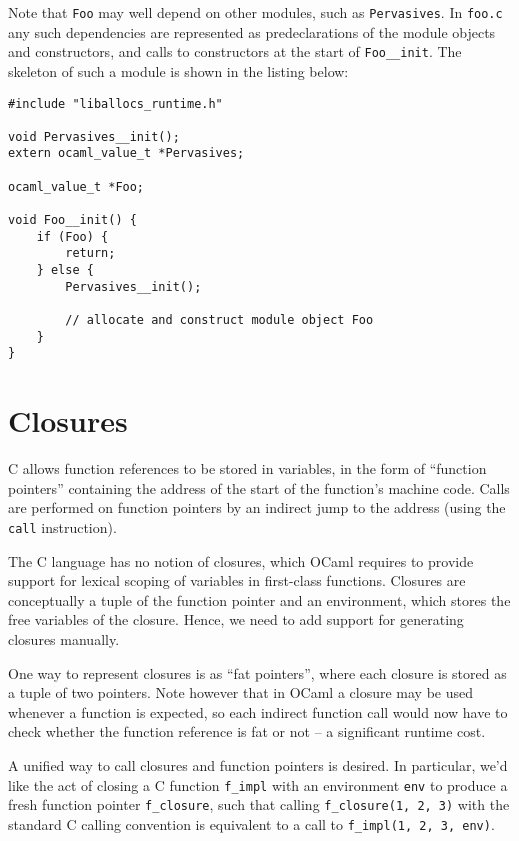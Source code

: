 \documentclass[12pt,a4paper,twoside,openright]{report}
\begin{document}
Note that \lstinline!Foo! may well depend on other modules, such as \lstinline!Pervasives!. In \lstinline!foo.c! any such dependencies are represented as predeclarations of the module objects and constructors, and calls to constructors at the start of \lstinline!Foo__init!. The skeleton of such a module is shown in the listing below:

\begin{lstlisting}
#include "liballocs_runtime.h"

void Pervasives__init();
extern ocaml_value_t *Pervasives;

ocaml_value_t *Foo;

void Foo__init() {
    if (Foo) {
        return;
    } else {
        Pervasives__init();

        // allocate and construct module object Foo
    }
}
\end{lstlisting}

\section{Closures}

C allows function references to be stored in variables, in the form of
``function pointers'' containing the address of the start of the function's
machine code. Calls are performed on function pointers by an indirect jump to
the address (using the \lstinline!call! instruction).

The C language has no notion of closures, which OCaml requires to provide
support for lexical scoping of variables in first-class functions. Closures are
conceptually a tuple of the function pointer and an environment, which stores
the free variables of the closure. Hence, we need to add support for generating
closures manually.

One way to represent closures is as ``fat pointers'', where each closure is
stored as a tuple of two pointers. Note however that in OCaml a closure may be
used whenever a function is expected, so each indirect function call would now
have to check whether the function reference is fat or not -- a significant
runtime cost.

A unified way to call closures and function pointers is desired. In
particular, we'd like the act of closing a C function \lstinline!f_impl! with
an environment \lstinline!env! to produce a fresh function pointer
\lstinline!f_closure!, such that calling
\lstinline!f_closure(1, 2, 3)!
with the standard C calling convention is equivalent to a call to
\lstinline!f_impl(1, 2, 3, env)!.
\end{document}
